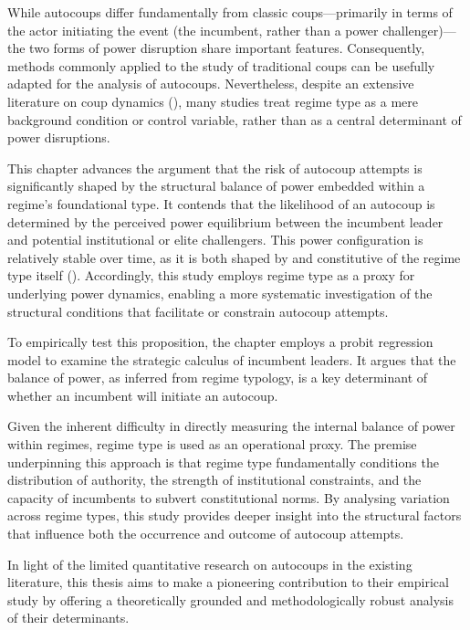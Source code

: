 \documentclass[
  12pt,
]{report}
\begin{document}
While autocoups differ fundamentally from classic coups---primarily in
terms of the actor initiating the event (the incumbent, rather than a
power challenger)---the two forms of power disruption share important
features. Consequently, methods commonly applied to the study of
traditional coups can be usefully adapted for the analysis of autocoups.
Nevertheless, despite an extensive literature on coup dynamics
(), many
studies treat regime type as a mere background condition or control
variable, rather than as a central determinant of power disruptions.

This chapter advances the argument that the risk of autocoup attempts is
significantly shaped by the structural balance of power embedded within
a regime's foundational type. It contends that the likelihood of an
autocoup is determined by the perceived power equilibrium between the
incumbent leader and potential institutional or elite challengers. This
power configuration is relatively stable over time, as it is both shaped
by and constitutive of the regime type itself
().
Accordingly, this study employs regime type as a proxy for underlying
power dynamics, enabling a more systematic investigation of the
structural conditions that facilitate or constrain autocoup attempts.

To empirically test this proposition, the chapter employs a probit
regression model to examine the strategic calculus of incumbent leaders.
It argues that the balance of power, as inferred from regime typology,
is a key determinant of whether an incumbent will initiate an autocoup.

Given the inherent difficulty in directly measuring the internal balance
of power within regimes, regime type is used as an operational proxy.
The premise underpinning this approach is that regime type fundamentally
conditions the distribution of authority, the strength of institutional
constraints, and the capacity of incumbents to subvert constitutional
norms. By analysing variation across regime types, this study provides
deeper insight into the structural factors that influence both the
occurrence and outcome of autocoup attempts.

In light of the limited quantitative research on autocoups in the
existing literature, this thesis aims to make a pioneering contribution
to their empirical study by offering a theoretically grounded and
methodologically robust analysis of their determinants.
\end{document}
